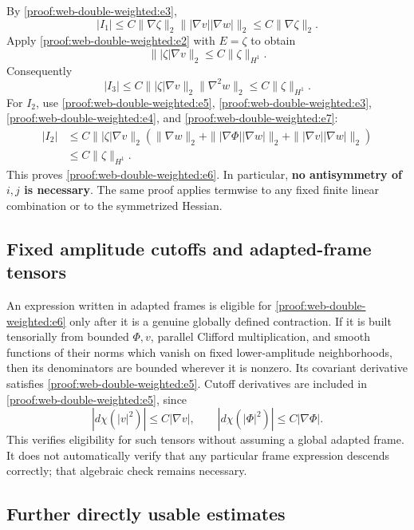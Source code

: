 By \eqref{proof:web-double-weighted:e3}, \[
|I_1|\le C\|\nabla\zeta\|_2
\||\nabla v||\nabla w|\|_2
\le C\|\nabla\zeta\|_2.
\] Apply \eqref{proof:web-double-weighted:e2} with \(E=\zeta\) to obtain \[
\||\zeta|\nabla v\|_2\le C\|\zeta\|_{H^1}.
\tag{\thesection.7}\label{proof:web-double-weighted:e7}
\] Consequently \[
|I_3|\le C\||\zeta|\nabla v\|_2\|\nabla^2w\|_2
\le C\|\zeta\|_{H^1}.
\] For \(I_2\), use \eqref{proof:web-double-weighted:e5}, \eqref{proof:web-double-weighted:e3}, \eqref{proof:web-double-weighted:e4}, and \eqref{proof:web-double-weighted:e7}: \[
\begin{aligned}
|I_2|
&\le C\||\zeta|\nabla v\|_2
\left(\|\nabla w\|_2+
\||\nabla\Phi||\nabla w|\|_2+
\||\nabla v||\nabla w|\|_2\right)\\
&\le C\|\zeta\|_{H^1}.
\end{aligned}
\] This proves \eqref{proof:web-double-weighted:e6}. In particular, \textbf{no antisymmetry of \(i,j\) is necessary}. The same proof applies termwise to any fixed finite linear combination or to the symmetrized Hessian.

\hypertarget{proof:web-double-weighted:s4}{%
\subsection{Fixed amplitude cutoffs and adapted-frame tensors}\label{proof:web-double-weighted:s4}}

An expression written in adapted frames is eligible for \eqref{proof:web-double-weighted:e6} only after it is a genuine globally defined contraction. If it is built tensorially from bounded \(\Phi,v\), parallel Clifford multiplication, and smooth functions of their norms which vanish on fixed lower-amplitude neighborhoods, then its denominators are bounded wherever it is nonzero. Its covariant derivative satisfies \eqref{proof:web-double-weighted:e5}. Cutoff derivatives are included in \eqref{proof:web-double-weighted:e5}, since \[
|d\chi(|v|^2)|\le C|\nabla v|,
\qquad |d\chi(|\Phi|^2)|\le C|\nabla\Phi|.
\] This verifies eligibility for such tensors without assuming a global adapted frame. It does not automatically verify that any particular frame expression descends correctly; that algebraic check remains necessary.

\hypertarget{proof:web-double-weighted:s5}{%
\subsection{Further directly usable estimates}\label{proof:web-double-weighted:s5}}

